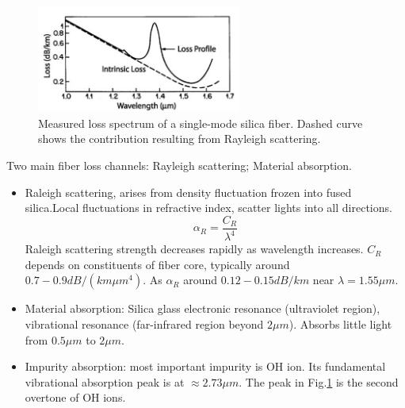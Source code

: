\documentclass[12pt]{extarticle}
\newcommand{\<}{\langle}
\renewcommand{\>}{\rangle}
\theoremstyle{definition}
\begin{document}
            
            \begin{figure}[htbp]
                \centering
                \includegraphics[width=0.6\textwidth]{images/fig1.3.PNG}
                \caption{Measured loss spectrum of a single-mode silica ﬁber. Dashed curve shows the contribution resulting from Rayleigh scattering.}
                \label{fig1.3}
            \end{figure}
            
            Two main fiber loss channels: Rayleigh scattering; Material absorption.
            \begin{itemize}
                \item Raleigh scattering, arises from density fluctuation frozen into fused silica.Local fluctuations in refractive index, scatter lights into all directions.
                    \begin{equation}
                        \alpha_R = \frac{C_R}{\lambda^4}
                    \end{equation}
                    Raleigh scattering strength decreases rapidly as wavelength increases. $C_R$ depends on constituents of fiber core, typically around $0.7-0.9 dB/(km \mu m^4)$. As $\alpha_R$ around $0.12-0.15 dB/km$ near $\lambda = 1.55 \mu m$.
                \item Material absorption: Silica glass electronic resonance (ultraviolet region), vibrational resonance (far-infrared region beyond $2 \mu m$). Absorbs little light from $0.5 \mu m$ to $2 \mu m$.
                \item Impurity absorption: most important impurity is OH ion. Its fundamental vibrational absorption peak is at $\approx 2.73 \mu m$. The peak in Fig.\ref{fig1.3} is the second overtone of OH ions.
            \end{itemize}
            
\end{document}
